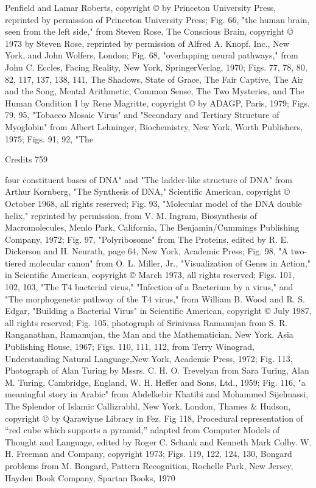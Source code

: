 Penfield and Lamar Roberts, copyright © by Princeton University Press, reprinted by
permission of Princeton University Press; Fig. 66, "the human brain, seen from the left
side," from Steven Rose, The Conscious Brain, copyright © 1973 by Steven Rose,
reprinted by permission of Alfred A. Knopf, Inc., New York, and John Wolfers, London;
Fig. 68, "overlapping neural pathways," from John C. Eccles, Facing Reality, New York,
SpringerVerlag, 1970; Figs. 77, 78, 80, 82, 117, 137, 138, 141, The Shadows, State of
Grace, The Fair
Captive, The Air and the Song, Mental Arithmetic, Common Sense, The Two Mysteries,
and The
Human Condition I by Rene Magritte, copyright © by ADAGP, Paris, 1979; Figs. 79, 95,
"Tobacco Mosaic Virus" and "Secondary and Tertiary Structure of Myoglobin" from
Albert Lehninger, Biochemistry, New York, Worth Publishers, 1975; Figs. 91, 92, "The

Credits                                                                               759

four constituent bases of DNA" and "The ladder-like structure of DNA" from Arthur
Kornberg, "The Synthesis of DNA," Scientific American, copyright © October 1968, all
rights reserved; Fig. 93, "Molecular model of the DNA double helix," reprinted by
permission, from V. M. Ingram, Biosynthesis of Macromolecules, Menlo Park,
California, The Benjamin/Cummings Publishing Company, 1972; Fig. 97,
"Polyribosome" from The Proteins, edited by R. E. Dickerson and H. Neurath, page 64,
New York, Academic Press; Fig. 98, "A two-tiered molecular canon" from O. L. Miller,
Jr., "Visualization of Genes in Action," in Scientific American, copyright © March 1973,
all rights reserved; Figs. 101, 102, 103, "The T4 bacterial virus," "Infection of a
Bacterium by a virus," and "The morphogenetic pathway of the T4 virus," from William
B. Wood and R. S. Edgar, "Building a Bacterial Virus" in Scientific American, copyright
© July 1987, all rights reserved; Fig.
105, photograph of Srinivasa Ramanujan from S. R. Ranganathan, Ramanujan, the Man
and the Mathematician, New York, Asia Publishing House, 1967; Figs. 110, 111, 112,
from Terry Winograd, Understanding Natural Language,New York, Academic Press,
1972; Fig. 113, Photograph of Alan Turing by Mssrs. C. H. O. Trevelyan from Sara
Turing, Alan M. Turing, Cambridge, England, W. H. Heffer and Sons, Ltd., 1959; Fig.
116, "a meaningful story in Arabic" from Abdelkebir Khatibi and Mohammed Sijelmassi,
The Splendor of Islamic Callizrabhl, New York, London, Thames \& Hudson, copyright
© by Qarawiyne Library in Fez. Fig 118, Procedural representation of “red cube which
supports a pyramid,” adapted from Computer Models of Thought and Language, edited
by Roger C. Schank and Kenneth Mark Colby. W. H. Freeman and Company, copyright
1973; Figs. 119, 122, 124, 130, Bongard problems from M. Bongard, Pattern
Recognition, Rochelle Park, New Jersey,
Hayden Book Company, Spartan Books, 1970

